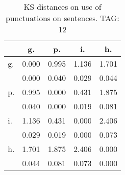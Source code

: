 \begin{table}[h!]
\begin{center}
\begin{tabular}{| l | c | c | c | c |}\hline
 & g. & p. & i. & h. \\\hline
g. & 0.000  & 0.995  & 1.136  & 1.701 \\\hline
 & 0.000  & 0.040  & 0.029  & 0.044 \\\hline
p. & 0.995  & 0.000  & 0.431  & 1.875 \\\hline
 & 0.040  & 0.000  & 0.019  & 0.081 \\\hline
i. & 1.136  & 0.431  & 0.000  & 2.406 \\\hline
 & 0.029  & 0.019  & 0.000  & 0.073 \\\hline
h. & 1.701  & 1.875  & 2.406  & 0.000 \\\hline
 & 0.044  & 0.081  & 0.073  & 0.000 \\\hline
\end{tabular}
\caption{KS distances on use of punctuations on sentences. TAG: 12}
\end{center}
\end{table}